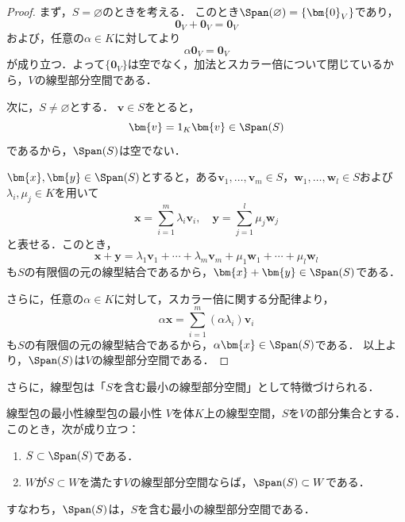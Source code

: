 \begin{leftbar}
\begin{proof}
  まず，$S = \varnothing$のときを考える．
  このとき$\Span(\varnothing) = \{\bm{0}_V\}$であり，
  \[
    \bm{0}_V + \bm{0}_V = \bm{0}_V
  \]
  および，任意の$\alpha \in K$に対してより
  \[
    \alpha \bm{0}_V = \bm{0}_V
  \]
  が成り立つ．よって$\{\bm{0}_V\}$は空でなく，加法とスカラー倍について閉じているから，$V$の線型部分空間である．

  次に，$S \neq \varnothing$とする．
  $\bm{v} \in S$をとると，
  \[
    \bm{v} = 1_K \bm{v} \in \Span(S)
  \]
  であるから，$\Span(S)$は空でない．

  $\bm{x}, \bm{y} \in \Span(S)$とすると，ある$\bm{v}_1, \dots, \bm{v}_m \in S$，$\bm{w}_1, \dots, \bm{w}_l \in S$および$\lambda_i, \mu_j \in K$を用いて
  \[
    \bm{x} = \sum_{i=1}^{m} \lambda_i \bm{v}_i, \quad
    \bm{y} = \sum_{j=1}^{l} \mu_j \bm{w}_j
  \]
  と表せる．このとき，
  \[
    \bm{x} + \bm{y}
    = \lambda_1 \bm{v}_1 + \cdots + \lambda_m \bm{v}_m + \mu_1 \bm{w}_1 + \cdots + \mu_l \bm{w}_l
  \]
  も$S$の有限個の元の線型結合であるから，$\bm{x} + \bm{y} \in \Span(S)$である．

  さらに，任意の$\alpha \in K$に対して，スカラー倍に関する分配律より，
  \[
    \alpha\bm{x} = \sum_{i=1}^{m} (\alpha\lambda_i) \bm{v}_i
  \]
  も$S$の有限個の元の線型結合であるから，$\alpha\bm{x} \in \Span(S)$である．
  以上より，$\Span(S)$は$V$の線型部分空間である．
\end{proof}
\end{leftbar}

さらに，線型包は「$S$を含む最小の線型部分空間」として特徴づけられる．

\begin{prop}{線型包の最小性}{線型包の最小性}
  $V$を体$K$上の線型空間，$S$を$V$の部分集合とする．このとき，次が成り立つ：
  \begin{enumerate}[label=(\roman*),leftmargin=3.2em]
    \item $S \subset \Span(S)$である．
    \item $W$が$S \subset W$を満たす$V$の線型部分空間ならば，$\Span(S) \subset W$である．
  \end{enumerate}
  すなわち，$\Span(S)$は，$S$を含む最小の線型部分空間である．
\end{prop}

